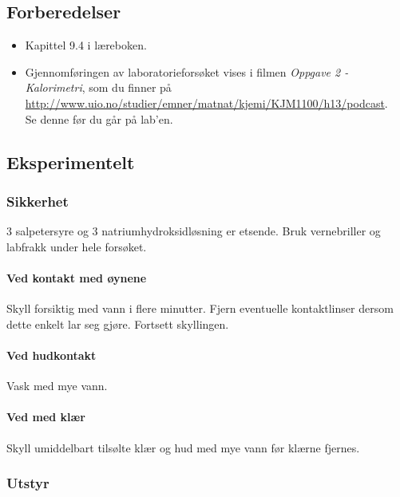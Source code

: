 		\subsection{Forberedelser}
	\begin{itemize}
		\item Kapittel 9.4 i læreboken.
		\item Gjennomføringen av laboratorieforsøket vises i filmen \emph{Oppgave 2 - Kalorimetri}, som du finner på \\ \url{http://www.uio.no/studier/emner/matnat/kjemi/KJM1100/h13/podcast}. \\
		Se denne før du går på lab'en.
	\end{itemize}
	
	\subsection{Eksperimentelt}
	
	\subsubsection{Sikkerhet}
	\SI{3}{\molar} salpetersyre og \SI{3}{\molar} natriumhydroksidløsning er etsende. Bruk vernebriller og labfrakk under hele forsøket.
	
	\paragraph{Ved kontakt med øynene}
	Skyll forsiktig med vann i flere minutter. Fjern eventuelle kontaktlinser dersom dette enkelt lar seg gjøre. Fortsett skyllingen.
	
	\paragraph{Ved hudkontakt}
	Vask med mye vann.
	
	\paragraph{Ved med klær}
	Skyll umiddelbart tilsølte klær og hud med mye vann før klærne fjernes. 
	
	\subsubsection{Utstyr}
	
